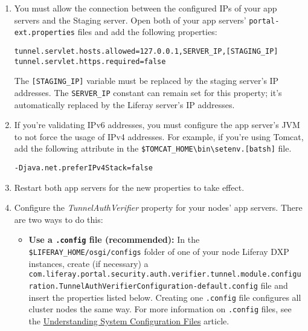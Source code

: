 \begin{enumerate}
\def\labelenumi{\arabic{enumi}.}
\setcounter{enumi}{1}
\item
  You must allow the connection between the configured IPs of your app
  servers and the Staging server. Open both of your app servers'
  \texttt{portal-ext.properties} files and add the following properties:

\begin{verbatim}
tunnel.servlet.hosts.allowed=127.0.0.1,SERVER_IP,[STAGING_IP]
tunnel.servlet.https.required=false
\end{verbatim}

  The \texttt{{[}STAGING\_IP{]}} variable must be replaced by the
  staging server's IP addresses. The \texttt{SERVER\_IP} constant can
  remain set for this property; it's automatically replaced by the
  Liferay server's IP addresses.
\item
  If you're validating IPv6 addresses, you must configure the app
  server's JVM to not force the usage of IPv4 addresses. For example, if
  you're using Tomcat, add the following attribute in the
  \texttt{\$TOMCAT\_HOME\textbackslash{}bin\textbackslash{}setenv.{[}bat\textbar{}sh{]}}
  file.

  \texttt{-Djava.net.preferIPv4Stack=false}
\item
  Restart both app servers for the new properties to take effect.
\item
  Configure the \emph{TunnelAuthVerifier} property for your nodes' app
  servers. There are two ways to do this:

  \begin{itemize}
  \item
    \textbf{Use a \texttt{.config} file (recommended):} In the
    \texttt{\$LIFERAY\_HOME/osgi/configs} folder of one of your node
    Liferay DXP instances, create (if necessary) a
    \texttt{com.liferay.portal.security.auth.verifier.tunnel.module.configuration.TunnelAuthVerifierConfiguration-default.config}
    file and insert the properties listed below. Creating one
    \texttt{.config} file configures all cluster nodes the same way. For
    more information on \texttt{.config} files, see the
    \href{/docs/7-0/user/-/knowledge_base/u/understanding-system-configuration-files}{Understanding
    System Configuration Files} article.


\end{itemize}
\end{enumerate}
